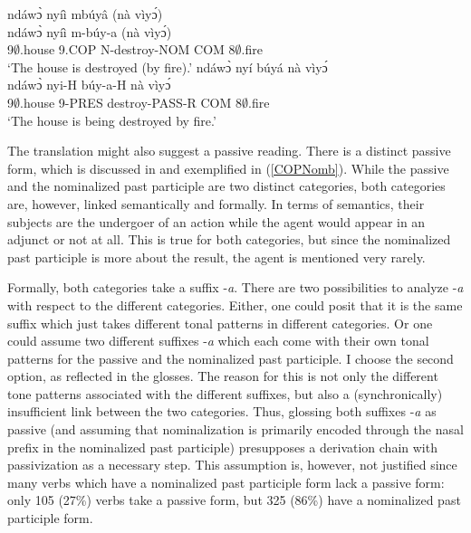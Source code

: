 \begin{exe}
\ex\label{COPNom} 
\begin{xlist}
\ex\label{COPNoma} 
\glll ndáwɔ̀ nyíì mbúyâ (nà vìyɔ́) \\
	ndáwɔ̀ nyíì m-búy-a (nà vìyɔ́) \\
	9$\emptyset$.house 9.COP N-destroy-NOM COM 8$\emptyset$.fire \\
 \trans `The house is destroyed (by fire).'
\ex\label{COPNomb} 
\glll ndáwɔ̀ nyí búyá nà vìyɔ́\\
	ndáwɔ̀ nyi-H búy-a-H nà vìyɔ́\\
	9$\emptyset$.house 9-PRES destroy-PASS-R COM 8$\emptyset$.fire \\
 \trans `The house is being destroyed by fire.'
\end{xlist}
\end{exe}

The translation might also suggest a passive reading. There is a distinct passive form, which is discussed in  and exemplified in (\ref{COPNomb}). While  the passive and the nominalized past participle are two distinct categories, both categories are, however, linked semantically and formally. In terms of semantics, their subjects are the undergoer of an action while the agent would appear in an adjunct or not at all. This is true for both categories, but since the nominalized past participle is more about the result, the agent is mentioned very rarely.

Formally, both categories take a suffix -{\itshape a}.  There are two possibilities to analyze -{\itshape a} with respect to the different categories. Either, one could posit that it is the same suffix which just takes different tonal patterns in different categories. Or one could assume two different suffixes -{\itshape a} which each come with their own tonal patterns for the passive and the nominalized past participle. I choose the second option, as reflected  in the glosses. The reason for this is not only the different tone patterns associated with the different suffixes, but also a (synchronically) insufficient link between the two categories. Thus, glossing both suffixes -{\itshape a} as passive (and assuming that nominalization is primarily encoded through the nasal prefix in the nominalized past participle) presupposes a derivation chain with passivization as a necessary step.  This assumption is, however, not justified since many verbs which have a nominalized past participle form lack a passive form: only 105 (27\%) verbs take a passive form, but 325 (86\%) have a nominalized past participle form.

